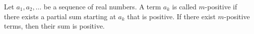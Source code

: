 Let $a_1, a_2, \ldots$ be a sequence of real numbers. A term $a_k$ is called $m$-positive if there exists a partial sum starting at $a_k$ that is positive. If there exist $m$-positive terms, then their sum is positive.
